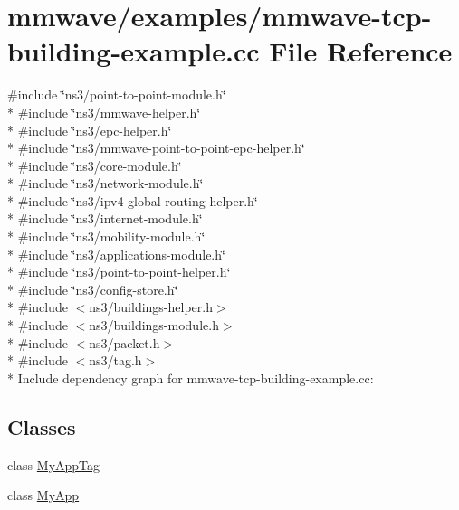 \hypertarget{mmwave-tcp-building-example_8cc}{}\section{mmwave/examples/mmwave-\/tcp-\/building-\/example.cc File Reference}
\label{mmwave-tcp-building-example_8cc}
{\ttfamily \#include \char`\"{}ns3/point-\/to-\/point-\/module.\+h\char`\"{}}\\*
{\ttfamily \#include \char`\"{}ns3/mmwave-\/helper.\+h\char`\"{}}\\*
{\ttfamily \#include \char`\"{}ns3/epc-\/helper.\+h\char`\"{}}\\*
{\ttfamily \#include \char`\"{}ns3/mmwave-\/point-\/to-\/point-\/epc-\/helper.\+h\char`\"{}}\\*
{\ttfamily \#include \char`\"{}ns3/core-\/module.\+h\char`\"{}}\\*
{\ttfamily \#include \char`\"{}ns3/network-\/module.\+h\char`\"{}}\\*
{\ttfamily \#include \char`\"{}ns3/ipv4-\/global-\/routing-\/helper.\+h\char`\"{}}\\*
{\ttfamily \#include \char`\"{}ns3/internet-\/module.\+h\char`\"{}}\\*
{\ttfamily \#include \char`\"{}ns3/mobility-\/module.\+h\char`\"{}}\\*
{\ttfamily \#include \char`\"{}ns3/applications-\/module.\+h\char`\"{}}\\*
{\ttfamily \#include \char`\"{}ns3/point-\/to-\/point-\/helper.\+h\char`\"{}}\\*
{\ttfamily \#include \char`\"{}ns3/config-\/store.\+h\char`\"{}}\\*
{\ttfamily \#include $<$ns3/buildings-\/helper.\+h$>$}\\*
{\ttfamily \#include $<$ns3/buildings-\/module.\+h$>$}\\*
{\ttfamily \#include $<$ns3/packet.\+h$>$}\\*
{\ttfamily \#include $<$ns3/tag.\+h$>$}\\*
Include dependency graph for mmwave-\/tcp-\/building-\/example.cc\+:
\subsection*{Classes}
\begin{DoxyCompactItemize}
\item 
class \hyperlink{classMyAppTag}{My\+App\+Tag}
\item 
class \hyperlink{classMyApp}{My\+App}
\end{DoxyCompactItemize}
